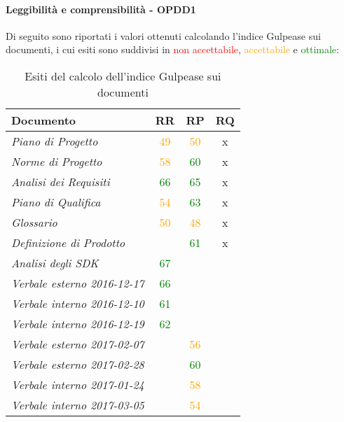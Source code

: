 \documentclass[PdQ.tex]{subfiles}
\begin{document}
		\paragraph{Leggibilità e comprensibilità - OPDD1}
				Di seguito sono riportati i valori ottenuti calcolando l'indice Gulpease sui documenti, i cui esiti sono suddivisi in \textcolor{red}{non accettabile}, \textcolor{orange}{accettabile} e \textcolor{green}{ottimale}:
				\begin{table}[h]
				\centering
				\begin{tabular}{l c c c}
					\hline
					\rule[-0.3cm]{0cm}{0.8cm}
					\textbf{Documento} & \textbf{RR} & \textbf{RP} & \textbf{RQ}\\
					\hline
					\rule[0cm]{0cm}{0.4cm}
					\textit{Piano di Progetto} & \textcolor{orange}{49} & \textcolor{orange}{50} & x \\
					\rule[0cm]{0cm}{0.4cm}
					\textit{Norme di Progetto}& \textcolor{orange}{58} & \textcolor{green}{60} & x \\ 
					\rule[0cm]{0cm}{0.4cm}
					\textit{Analisi dei Requisiti} & \textcolor{green}{66} & \textcolor{green}{65} & x \\ 
					\rule[0cm]{0cm}{0.4cm}
					\textit{Piano di Qualifica} & \textcolor{orange}{54} & \textcolor{green}{63} & x \\ 
					\rule[0cm]{0cm}{0.4cm}
					\textit{Glossario} & \textcolor{orange}{50} & \textcolor{orange}{48} & x\\ 
					\rule[0cm]{0cm}{0.4cm}
					\textit{Definizione di Prodotto} & & \textcolor{green}{61} & x \\
					\rule[0cm]{0cm}{0.4cm}
					\textit{Analisi degli SDK} & \textcolor{green}{67} & &  \\ 
					\rule[0cm]{0cm}{0.4cm}
					\textit{Verbale esterno 2016-12-17} & \textcolor{green}{66} & & \\ 
					\rule[0cm]{0cm}{0.4cm}
					\textit{Verbale interno 2016-12-10} & \textcolor{green}{61} & & \\ 
					\rule[0cm]{0cm}{0.4cm}
					\textit{Verbale interno 2016-12-19} & \textcolor{green}{62} & & \\ 
					\rule[0cm]{0cm}{0.4cm}
					\textit{Verbale esterno 2017-02-07} & & \textcolor{orange}{56} & \\ 
					\rule[0cm]{0cm}{0.4cm}
					\textit{Verbale esterno 2017-02-28} & & \textcolor{green}{60} & \\ 
					\rule[0cm]{0cm}{0.4cm}
					\textit{Verbale interno 2017-01-24} & & \textcolor{orange}{58} & \\ 
					\rule[0cm]{0cm}{0.4cm}
					\textit{Verbale interno 2017-03-05} & & \textcolor{orange}{54} & \\
					\hline
				\end{tabular}
				\caption{Esiti del calcolo dell'indice Gulpease sui documenti}
			\end{table}		
\end{document}
